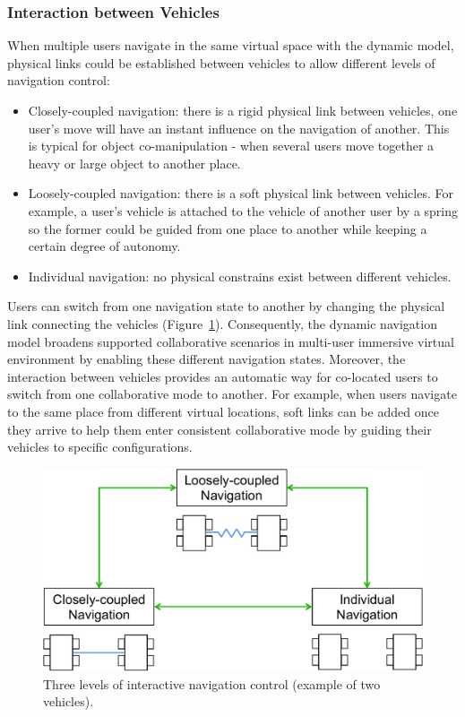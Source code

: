 \subsubsection{Interaction between Vehicles}
When multiple users navigate in the same virtual space with the dynamic model, physical links could be established between vehicles to allow different levels of navigation control:     

\begin{itemize}
\item Closely-coupled navigation: there is a rigid physical link between vehicles, one user's move will have an instant influence on the navigation of another. This is typical for object co-manipulation - when several users move together a heavy or large object to another place.
\item Loosely-coupled navigation: there is a soft physical link between vehicles. For example, a user's vehicle is attached to the vehicle of another user by a spring so the former could be guided from one place to another while keeping a certain degree of autonomy.
\item Individual navigation: no physical constrains exist between different vehicles.
\end{itemize}

Users can switch from one navigation state to another by changing the physical link connecting the vehicles (Figure~\ref{fig:5_user_inter}). Consequently, the dynamic navigation model broadens supported collaborative scenarios in multi-user immersive virtual environment by enabling these different navigation states. Moreover, the interaction between vehicles provides an automatic way for co-located users to switch from one collaborative mode to another. For example, when users navigate to the same place from different virtual locations, soft links can be added once they arrive to help them enter consistent collaborative mode by guiding their vehicles to specific configurations.

\begin{figure}[htb]
  \centering
  \includegraphics[width=.8\textwidth]{figures/ch5/user_inter}
  \caption{\label{fig:5_user_inter}Three levels of interactive navigation control (example of two vehicles).}
\end{figure}


